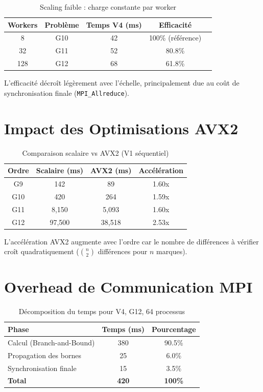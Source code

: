 \documentclass[12pt,a4paper,twoside]{report}
\begin{document}
\begin{table}[htbp]
\centering
\caption{Scaling faible : charge constante par worker}
\label{tab:weak-scaling}
\begin{tabular}{@{}ccccc@{}}
\toprule
\textbf{Workers} & \textbf{Problème} & \textbf{Temps V4 (ms)} & \textbf{Efficacité} \\
\midrule
8 & G10 & 42 & 100\% (référence) \\
32 & G11 & 52 & 80.8\% \\
128 & G12 & 68 & 61.8\% \\
\bottomrule
\end{tabular}
\end{table}

L'efficacité décroît légèrement avec l'échelle, principalement due au coût de synchronisation finale (\texttt{MPI\_Allreduce}).

\section{Impact des Optimisations AVX2}

\begin{table}[htbp]
\centering
\caption{Comparaison scalaire vs AVX2 (V1 séquentiel)}
\label{tab:avx2-impact}
\begin{tabular}{@{}cccc@{}}
\toprule
\textbf{Ordre} & \textbf{Scalaire (ms)} & \textbf{AVX2 (ms)} & \textbf{Accélération} \\
\midrule
G9 & 142 & 89 & 1.60x \\
G10 & 420 & 264 & 1.59x \\
G11 & 8,150 & 5,093 & 1.60x \\
G12 & 97,500 & 38,518 & 2.53x \\
\bottomrule
\end{tabular}
\end{table}

L'accélération AVX2 augmente avec l'ordre car le nombre de différences à vérifier croît quadratiquement ($\binom{n}{2}$ différences pour $n$ marques).

\section{Overhead de Communication MPI}

\begin{table}[htbp]
\centering
\caption{Décomposition du temps pour V4, G12, 64 processus}
\label{tab:communication-overhead}
\begin{tabular}{@{}lcc@{}}
\toprule
\textbf{Phase} & \textbf{Temps (ms)} & \textbf{Pourcentage} \\
\midrule
Calcul (Branch-and-Bound) & 380 & 90.5\% \\
Propagation des bornes & 25 & 6.0\% \\
Synchronisation finale & 15 & 3.5\% \\
\midrule
\textbf{Total} & \textbf{420} & \textbf{100\%} \\
\bottomrule
\end{tabular}
\end{table}
\end{document}
